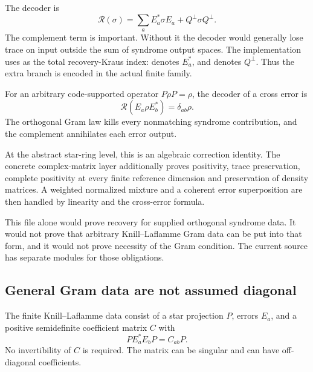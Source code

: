 
The decoder is
\[
\mathcal R(\sigma)=\sum_aE_a^*\sigma E_a+Q^\perp\sigma Q^\perp.
\]
The complement term is important. Without it the decoder would generally lose trace on input outside the sum of syndrome output spaces. The implementation uses  as the total recovery-Kraus index:  denotes $E_a^*$, and  denotes $Q^\perp$. Thus the extra branch is encoded in the actual finite family.



For an arbitrary code-supported operator $P\rho P=\rho$, the decoder of a cross error is
\[
\mathcal R(E_a\rho E_b^*)=\delta_{ab}\rho.
\]
The orthogonal Gram law kills every nonmatching syndrome contribution, and the complement annihilates each error output.


At the abstract star-ring level, this is an algebraic correction identity. The concrete complex-matrix layer additionally proves positivity, trace preservation, complete positivity at every finite reference dimension and preservation of density matrices. A weighted normalized mixture and a coherent error superposition are then handled by linearity and the cross-error formula.

This file alone would prove recovery for supplied orthogonal syndrome data. It would not prove that arbitrary Knill--Laflamme Gram data can be put into that form, and it would not prove necessity of the Gram condition. The current source has separate modules for those obligations.

\subsection{General Gram data are not assumed diagonal}
The finite Knill--Laflamme data consist of a star projection $P$, errors $E_a$, and a positive semidefinite coefficient matrix $C$ with
\[
PE_a^*E_bP=C_{ab}P.
\]
No invertibility of $C$ is required. The matrix can be singular and can have off-diagonal coefficients.

